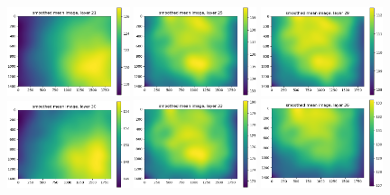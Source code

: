 \documentclass[letterpaper,11pt]{article}
\begin{document}
\begin{figure}[!ht]
\centering
\includegraphics[width=0.32\textwidth]{images/results/smoothed_mean_image_layers_polaris/smoothed_mean_image_layer_21}
\includegraphics[width=0.32\textwidth]{images/results/smoothed_mean_image_layers_polaris/smoothed_mean_image_layer_25}
\includegraphics[width=0.32\textwidth]{images/results/smoothed_mean_image_layers_polaris/smoothed_mean_image_layer_29}
\includegraphics[width=0.32\textwidth]{images/results/smoothed_mean_image_layers_polaris/smoothed_mean_image_layer_30}
\includegraphics[width=0.32\textwidth]{images/results/smoothed_mean_image_layers_polaris/smoothed_mean_image_layer_33}
\includegraphics[width=0.32\textwidth]{images/results/smoothed_mean_image_layers_polaris/smoothed_mean_image_layer_36}

\end{figure}
\end{document}

